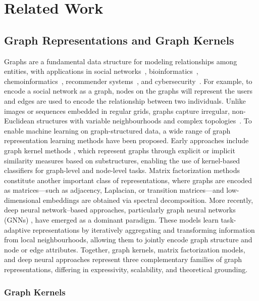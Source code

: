 
\chapter{Related Work}
\label{ch:related}

\section{Graph Representations and Graph Kernels}
\label{sec:rw:kernels}

Graphs are a fundamental data structure for modeling relationships among
entities, with applications in social networks~\citep{newman2003structure},
bioinformatics~\citep{borgwardt2005protein},
chemoinformatics~\citep{weininger1988smiles}, recommender
systems~\citep{ying2018graph}, and cybersecurity~\citep{10.1145/310889.310919}. For example, to encode a social network as a graph, nodes on the graphs will represent the users and edges are used to encode the relationship between two individuals. Unlike images or sequences embedded in regular grids, graphs capture irregular,
non-Euclidean structures with variable neighbourhoods and complex
topologies~\citep{bronstein2017geometric}. To enable machine learning on graph-structured data, a wide range of graph representation learning methods have been proposed. Early approaches include graph kernel methods \citep{nikolentzos2021graph}, which represent graphs through explicit or implicit similarity measures based on substructures, enabling the use of kernel-based classifiers for graph-level and node-level tasks. Matrix factorization methods  \citep{huang2022graphgdp} constitute another important class of representations, where graphs are encoded as matrices—such as adjacency, Laplacian, or transition matrices—and low-dimensional embeddings are obtained via spectral decomposition. More recently, deep neural network–based approaches, particularly graph neural networks (GNNs) \citep{kipf2017semi,xu2019powerful}, have emerged as a dominant paradigm. These models learn task-adaptive representations by iteratively aggregating and transforming information from local neighbourhoods, allowing them to jointly encode graph structure and node or edge attributes. Together, graph kernels, matrix factorization models, and deep neural approaches represent three complementary families of graph representations, differing in expressivity, scalability, and theoretical grounding.

\subsection{ Graph Kernels}

